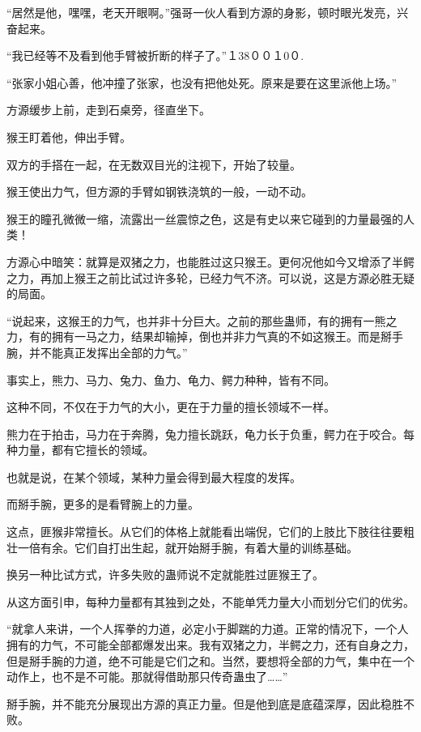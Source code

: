
\begin{this_body}

“居然是他，嘿嘿，老天开眼啊。”强哥一伙人看到方源的身影，顿时眼光发亮，兴奋起来。

“我已经等不及看到他手臂被折断的样子了。”１38００１0０.

“张家小姐心善，他冲撞了张家，也没有把他处死。原来是要在这里派他上场。”

方源缓步上前，走到石桌旁，径直坐下。

猴王盯着他，伸出手臂。

双方的手搭在一起，在无数双目光的注视下，开始了较量。

猴王使出力气，但方源的手臂如钢铁浇筑的一般，一动不动。

猴王的瞳孔微微一缩，流露出一丝震惊之色，这是有史以来它碰到的力量最强的人类！

方源心中暗笑：就算是双猪之力，也能胜过这只猴王。更何况他如今又增添了半鳄之力，再加上猴王之前比试过许多轮，已经力气不济。可以说，这是方源必胜无疑的局面。

“说起来，这猴王的力气，也并非十分巨大。之前的那些蛊师，有的拥有一熊之力，有的拥有一马之力，结果却输掉，倒也并非力气真的不如这猴王。而是掰手腕，并不能真正发挥出全部的力气。”

事实上，熊力、马力、兔力、鱼力、龟力、鳄力种种，皆有不同。

这种不同，不仅在于力气的大小，更在于力量的擅长领域不一样。

熊力在于拍击，马力在于奔腾，兔力擅长跳跃，龟力长于负重，鳄力在于咬合。每种力量，都有它擅长的领域。

也就是说，在某个领域，某种力量会得到最大程度的发挥。

而掰手腕，更多的是看臂腕上的力量。

这点，匪猴非常擅长。从它们的体格上就能看出端倪，它们的上肢比下肢往往要粗壮一倍有余。它们自打出生起，就开始掰手腕，有着大量的训练基础。

换另一种比试方式，许多失败的蛊师说不定就能胜过匪猴王了。

从这方面引申，每种力量都有其独到之处，不能单凭力量大小而划分它们的优劣。

“就拿人来讲，一个人挥拳的力道，必定小于脚踹的力道。正常的情况下，一个人拥有的力气，不可能全部都爆发出来。我有双猪之力，半鳄之力，还有自身之力，但是掰手腕的力道，绝不可能是它们之和。当然，要想将全部的力气，集中在一个动作上，也不是不可能。那就得借助那只传奇蛊虫了……”

掰手腕，并不能充分展现出方源的真正力量。但是他到底是底蕴深厚，因此稳胜不败。


\end{this_body}
